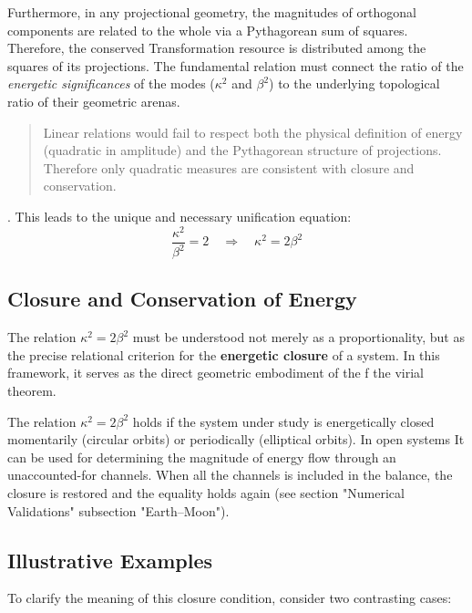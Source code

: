 \documentclass[12pt, a4paper]{article}
\begin{document}
Furthermore, in any projectional geometry, the magnitudes of orthogonal components are related to the whole via a Pythagorean sum of squares. Therefore, the conserved Transformation resource is distributed among the squares of its projections. The fundamental relation must connect the ratio of the \textit{energetic significances} of the modes ($\kappa^2$ and $\beta^2$) to the underlying topological ratio of their geometric arenas.
\begin{quote}
 Linear relations would fail to respect both the physical definition of energy (quadratic in amplitude) and the Pythagorean structure of projections. Therefore only quadratic measures are consistent with closure and conservation. 
\end{quote}.
This leads to the unique and necessary unification equation:
\[
\frac{\kappa^2}{\beta^2} = 2 \quad \Longrightarrow \quad \boxed{\kappa^2 = 2\beta^2}
\]

\subsection{Closure and Conservation of Energy}

The relation $\kappa^2 = 2\beta^2$ must be understood not merely as a proportionality, but as the precise relational criterion for the \textbf{energetic closure} of a system. In this framework, it serves as the direct geometric embodiment of the f the virial theorem.

\begin{tcolorbox}[colback=gray!5, colframe=black!80!black, title=The Principle as a Diagnostic Invariant]
The relation $\boxed{\kappa^2 = 2\beta^2}$ holds if the system under study is energetically closed momentarily (circular orbits) or periodically (elliptical orbits).  In open systems It can be used for determining the magnitude of energy flow through an unaccounted-for channels. When all the channels is included in the balance, the closure is restored and the equality holds again (see section "Numerical Validations" subsection "Earth--Moon").
\end{tcolorbox}

\subsection*{Illustrative Examples}

To clarify the meaning of this closure condition, consider two contrasting cases:
\end{document}
